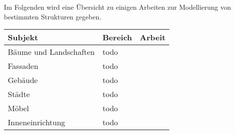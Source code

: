 Im Folgenden wird eine Übersicht zu einigen Arbeiten zur Modellierung von bestimmten Strukturen gegeben.
\begin{center}
    \begin{tabular}{lll}
        Subjekt & Bereich & Arbeit\\
        \hline
        Bäume und Landschaften & todo & ~\cite{deussen_2010} \\
        Fassaden & todo & ~\cite{alhalawani_2013} \\
        Gebäude & todo & ~\cite{mueller_2006} \\
        Städte & todo & ~\cite{parish_2001} \\
        Möbel & todo & ~\cite{merrell_2011} \\
        Inneneinrichtung & todo & ~\cite{zhang_2019} \\
    \end{tabular}
\end{center}

